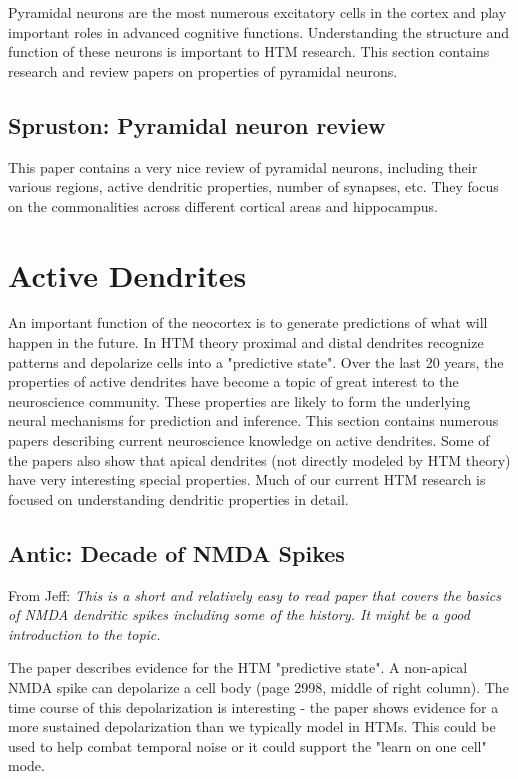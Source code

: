 \documentclass{article} %
\begin{document}
Pyramidal neurons are the most numerous excitatory cells in the cortex and play
important roles in advanced cognitive functions. Understanding the
structure and function of
these neurons is important to HTM research.   This section  contains research
and review papers on properties of pyramidal neurons.

\subsection{Spruston: Pyramidal neuron review}

This paper \cite{Spruston2008} contains a very nice review of
pyramidal neurons, including their various regions, active dendritic
properties, number of synapses, etc. They focus on the commonalities across
different cortical areas and hippocampus.

\section{Active Dendrites}

An important function of the neocortex is to generate predictions of what will
happen in the future. In HTM theory proximal and distal dendrites recognize
patterns and depolarize cells into a "predictive state". Over the last 20 years,
the properties of active dendrites have become a topic of great  interest to the
neuroscience community. These properties are likely to form the underlying
neural mechanisms for prediction and inference. This section contains numerous
papers describing current neuroscience knowledge on active dendrites.  Some of
the papers also show that apical dendrites (not directly modeled by HTM theory)
have very interesting special properties.  Much of our current HTM research
is focused on understanding dendritic properties in detail.

\subsection{Antic: Decade of NMDA Spikes}
From Jeff: \emph{This is a short and relatively easy to read paper that covers
 the basics of NMDA dendritic spikes including some of the history.  It might be a
good introduction to the topic.}

The paper \cite{Antic2010} describes evidence for the HTM "predictive state". A
non-apical NMDA spike can depolarize a cell body (page 2998, middle of right
column). The time course of this depolarization is interesting - the paper shows
evidence for a more sustained depolarization than we typically model in HTMs.
This could be used to help combat temporal noise or it could support the "learn
on one cell" mode.
\end{document}
